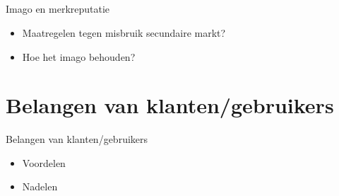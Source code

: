 \documentclass{beamer}
\begin{document}
    \subsection{}
    \begin{frame}{Imago en merkreputatie}
        \begin{itemize}
            \item Maatregelen tegen misbruik secundaire markt?
            \item Hoe het imago behouden?
        \end{itemize}
    \end{frame}


    

\section[Klant]{Belangen van klanten/gebruikers}
\begin{frame}{Belangen van klanten/gebruikers}
    \begin{itemize}
        \item Voordelen 
        \item Nadelen
    \end{itemize} 
\end{frame}
\end{document}
